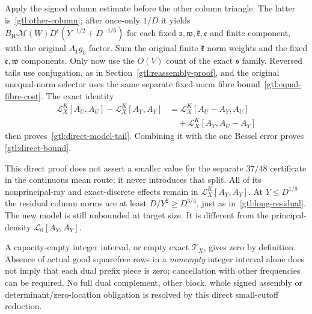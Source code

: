 Apply the signed column estimate before the other
column triangle. The latter is~\eqref{gtl:other-column};
after once-only $1/D$ it yields
$B_W\mathcal M(W)D^\epsilon
 (Y^{-1/2}+D^{-1/6})$ for each fixed
$\mathfrak s,\mathfrak w,\mathfrak k,\mathfrak e$
and finite component, with the original $A_1g_0$ factor.
Sum the original finite $\mathfrak k$ norm weights and
the fixed $\mathfrak e,\mathfrak w$ components.
Only now use the $O(V)$ count of the exact
$\mathfrak s$ family. Reversed tails use conjugation,
as in Section~\ref{gtl:reassembly-proof}, and the
original unequal-norm selector uses the same separate
fixed-norm fibre bound~\eqref{gtl:equal-fibre-cost}.
The exact identity
\begin{equation}\label{gtl:direct-bilinearity}
 \begin{aligned}
 \mathcal L_X^K[A_U,A_U]-\mathcal L_X^K[A_Y,A_Y]
  &=\mathcal L_X^K[A_U-A_Y,A_U]\\
  &\quad+\mathcal L_X^K[A_Y,A_U-A_Y]
 \end{aligned}
\end{equation}
then proves~\eqref{gtl:direct-model-tail}.
Combining it with the one Bessel error proves
\eqref{gtl:direct-bound}.

This direct proof does not assert a smaller value for
the separate $37/48$ certificate in the continuous
mean route; it never introduces that split.
All of its nonprincipal-ray and exact-discrete effects
remain in $\mathcal L_X^K[A_Y,A_Y]$.
At $Y\le D^{1/8}$ the residual column norms are at least
$D/Y^2\ge D^{3/4}$, just as in~\eqref{gtl:long-residual}.
The new model is still unbounded at target size.
It is different from the principal-density
$\mathcal L_0[A_Y,A_Y]$.

A capacity-empty integer interval, or empty exact
$\mathcal T_X$, gives zero by definition.
Absence of actual good squarefree rows in a
\emph{nonempty} integer interval alone does not imply
that each dual prefix piece is zero; cancellation
with other frequencies can be required.
No full dual complement, other block, whole signed
assembly or determinant/zero-location obligation is
resolved by this direct small-cutoff reduction.

